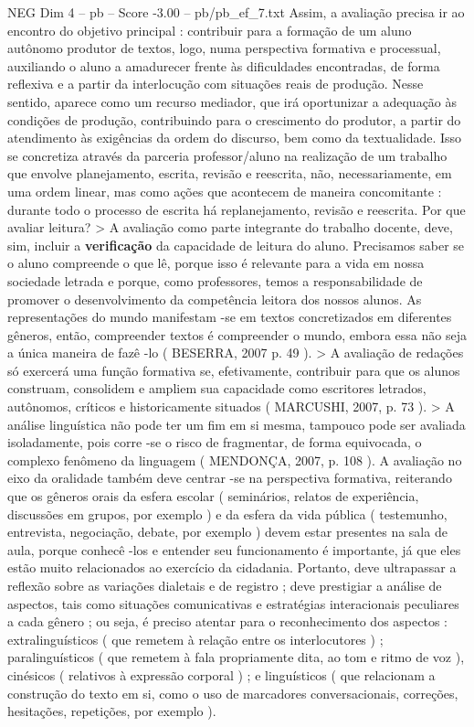 \begin{textsample}{NEG Dim 4 – pb – Score -3.00 – pb/pb\_ef\_7.txt}
Assim, a avaliação precisa ir ao encontro do objetivo principal : contribuir para a formação de um aluno autônomo produtor de textos, logo, numa perspectiva formativa e processual, auxiliando o aluno a amadurecer frente às dificuldades encontradas, de forma reflexiva e a partir da interlocução com situações reais de produção.
Nesse sentido, aparece como um recurso mediador, que irá oportunizar a adequação às condições de produção, contribuindo para o crescimento do produtor, a partir do atendimento às exigências da ordem do discurso, bem como da textualidade.
Isso se concretiza através da parceria professor/aluno na realização de um trabalho que envolve planejamento, escrita, revisão e reescrita, não, necessariamente, em uma ordem linear, mas como ações que acontecem de maneira concomitante : durante todo o processo de escrita há replanejamento, revisão e reescrita.
Por que avaliar leitura? > A avaliação como parte integrante do trabalho docente, deve, sim, incluir a \textbf{verificação} da capacidade de leitura do aluno.
Precisamos saber se o aluno compreende o que lê, porque isso é relevante para a vida em nossa sociedade letrada e porque, como professores, temos a responsabilidade de promover o desenvolvimento da competência leitora dos nossos alunos.
As representações do mundo manifestam -se em textos concretizados em diferentes gêneros, então, compreender textos é compreender o mundo, embora essa não seja a única maneira de fazê -lo ( BESERRA, 2007 p. 49 ). > A avaliação de redações só exercerá uma função formativa se, efetivamente, contribuir para que os alunos construam, consolidem e ampliem sua capacidade como escritores letrados, autônomos, críticos e historicamente situados ( MARCUSHI, 2007, p. 73 ). > A análise linguística não pode ter um fim em si mesma, tampouco pode ser avaliada isoladamente, pois corre -se o risco de fragmentar, de forma equivocada, o complexo fenômeno da linguagem ( MENDONÇA, 2007, p. 108 ).
A avaliação no eixo da oralidade também deve centrar -se na perspectiva formativa, reiterando que os gêneros orais da esfera escolar ( seminários, relatos de experiência, discussões em grupos, por exemplo ) e da esfera da vida pública ( testemunho, entrevista, negociação, debate, por exemplo ) devem estar presentes na sala de aula, porque conhecê -los e entender seu funcionamento é importante, já que eles estão muito relacionados ao exercício da cidadania.
Portanto, deve ultrapassar a reflexão sobre as variações dialetais e de registro ; deve prestigiar a análise de aspectos, tais como situações comunicativas e estratégias interacionais peculiares a cada gênero ; ou seja, é preciso atentar para o reconhecimento dos aspectos : extralinguísticos ( que remetem à relação entre os interlocutores ) ; paralinguísticos ( que remetem à fala propriamente dita, ao tom e ritmo de voz ), cinésicos ( relativos à expressão corporal ) ; e linguísticos ( que relacionam a construção do texto em si, como o uso de marcadores conversacionais, correções, hesitações, repetições, por exemplo ).

\end{textsample}
